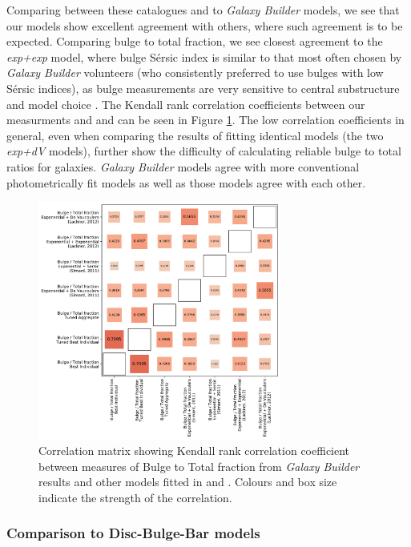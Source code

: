 \documentclass[../main.tex]{subfiles}
\begin{document}
Comparing between these catalogues and to \textit{Galaxy Builder} models, we see that our models show excellent agreement with others, where such agreement is to be expected. Comparing bulge to total fraction, we see closest agreement to the \textit{exp+exp} model, where bulge S\'ersic index is similar to that most often chosen by \textit{Galaxy Builder} volunteers (who consistently preferred to use bulges with low S\'ersic indices), as bulge measurements are very sensitive to central substructure and model choice \citep{Gao2017:1709.00746v1}. The Kendall rank correlation coefficients between our measurments and \citet{Simard2011:1107.1518v1} and \citet{2012MNRAS.421.2277L} can be seen in Figure \ref{fig:bt_correlation}. The low correlation coefficients in general, even when comparing the results of fitting identical models (the two \textit{exp+dV} models), further show the difficulty of calculating reliable bulge to total ratios for galaxies. \textit{Galaxy Builder} models agree with more conventional photometrically fit models as well  as those models agree with each other.


\begin{figure}
  \includegraphics[width=8cm]{images__results/b-t_comparison_correlation.pdf}
  \caption{Correlation matrix showing Kendall rank correlation coefficient between measures of Bulge to Total fraction from \textit{Galaxy Builder} results and other models fitted in \citet{Simard2011:1107.1518v1} and \citet{2012MNRAS.421.2277L}. Colours and box size indicate the strength of the correlation.}
  \label{fig:bt_correlation}
\end{figure}


\subsubsection{Comparison to Disc-Bulge-Bar models}
\end{document}
